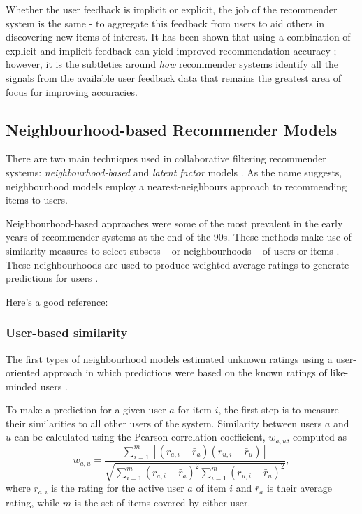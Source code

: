 Whether the user feedback is implicit or explicit, the job of the recommender system is the same - to aggregate this feedback from users to aid others in discovering new items of interest. It has been shown that using a combination of explicit and implicit feedback can yield improved recommendation accuracy \parencite{cf_1.4_comparison}; however, it is the subtleties around \textit{how} recommender systems identify all the signals from the available user feedback data that remains the greatest area of focus for improving accuracies.

\subsection{Neighbourhood-based Recommender Models}
There are two main techniques used in collaborative filtering recommender systems: \textit{neighbourhood-based} and \textit{latent factor} models \parencite{handbook_1.5_cf}. As the name suggests, neighbourhood models employ a nearest-neighbours approach to recommending items to users.

Neighbourhood-based approaches were some of the most prevalent in the early years of recommender systems at the end of the 90s. These methods make use of similarity measures to select subsets -- or neighbourhoods -- of users or items \parencite{cf_1.6_implicit}. These neighbourhoods are used to produce weighted average ratings to generate predictions for users \parencite{herlocker1999algorithmic}.

Here's a good reference: \parencite{herlocker2002empirical}

\subsubsection{User-based similarity}
The first types of neighbourhood models estimated unknown ratings using a user-oriented approach in which predictions were based on the known ratings of like-minded users \parencite{cf_1.6_implicit}.

To make a prediction for a given user $a$ for item $i$, the first step is to measure their similarities to all other users of the system. Similarity between users $a$ and $u$ can be calculated using the Pearson correlation coefficient, $w_{a,u}$, computed as
\begin{equation}
    w_{a,u} = \dfrac{\sum\limits_{i=1}^{m}[(r_{a,i}-\bar{r}_a)(r_{u,i}-\bar{r}_u)]}{\sqrt{\sum\limits_{i=1}^{m}(r_{a,i}-\bar{r}_a)^2\sum\limits_{i=1}^{m}(r_{u,i}-\bar{r}_u)^2}},
\end{equation}
where $r_{a,i}$ is the rating for the active user $a$ of item $i$ and $\bar{r}_a$ is their average rating, while $m$ is the set of items covered by either user.

